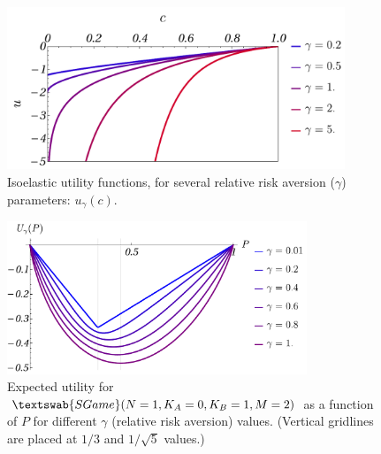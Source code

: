 \documentclass{beamer}
\theoremstyle{definition}
\newcommand{\SG}[1]{$\textswab{SGame}(#1)$}
\begin{document}
\begin{frame}{}

    \begin{figure}[H]
    \centering
    \includegraphics[width=0.9\textwidth]{img/u_gamma_c.pdf}
    \caption{\small \centering Isoelastic utility functions, for several relative risk aversion ($\gamma$) parameters: $u_\gamma(c)$.}
    \label{fig:IsoelasticUtility}
\end{figure}
\end{frame}

\begin{frame}{}


    \begin{figure}[H]
    \centering
    \includegraphics[width=0.8\textwidth]{img/EUP_1012_01.pdf}
    \caption{\small \centering Expected utility for \SG{N=1, K_A=0, K_B=1, M=2} as a function of $P$ for different $\gamma$ (relative risk aversion) values.
    (Vertical gridlines are placed at $1/3$ and $1/\sqrt{5}$ values.)}
    \label{fig:EUP_1012_01}
\end{figure}

\end{frame}
\end{document}

